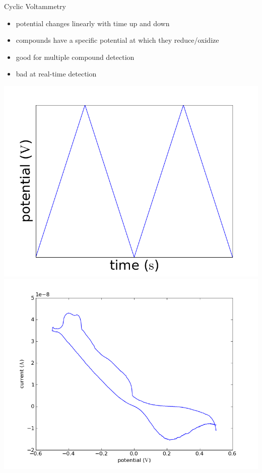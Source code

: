 \documentclass[10pt]{beamer}
\begin{document}
\begin{frame}{Cyclic Voltammetry}
	\begin{itemize}
		\item potential changes linearly with time up and down
		\item compounds have a specific potential at which they reduce/oxidize
		\item good for multiple compound detection
		\item bad at real-time detection
	\end{itemize}
	\includegraphics[width=0.5\linewidth]{figures/cv.png}
	\includegraphics[width=0.5\linewidth]{figures/63.png}
\end{frame}
\end{document}
